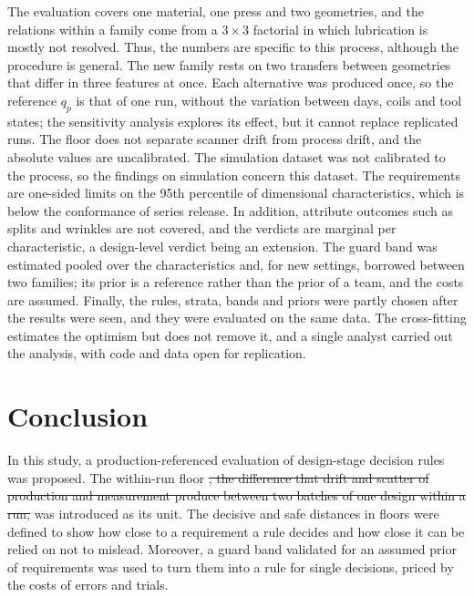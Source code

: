 \documentclass[pdflatex,sn-basic,lineno]{sn-jnl}
\providecommand{\DIFdel}[1]{{\protect\color{red}\sout{#1}}}                      %
\providecommand{\DIFdelbegin}{} %
\providecommand{\DIFdelend}{} %
\newcommand{\DIFscaledelfig}{0.5}
\newlength{\DIFdelgraphicswidth} %
\newlength{\DIFdelgraphicsheight} %
\newcommand{\DIFdelincludegraphics}[2][]{%
\sbox{\DIFdelgraphicsbox}{\DIFOincludegraphics[#1]{#2}}%
\settoboxwidth{\DIFdelgraphicswidth}{\DIFdelgraphicsbox} %
\settoboxtotalheight{\DIFdelgraphicsheight}{\DIFdelgraphicsbox} %
\scalebox{\DIFscaledelfig}{%
\parbox[b]{\DIFdelgraphicswidth}{\usebox{\DIFdelgraphicsbox}\\[-\baselineskip] \rule{\DIFdelgraphicswidth}{0em}}\llap{\resizebox{\DIFdelgraphicswidth}{\DIFdelgraphicsheight}{%
\setlength{\unitlength}{\DIFdelgraphicswidth}%
\begin{picture}(1,1)%
\thicklines\linethickness{2pt} %
{\color[rgb]{1,0,0}\put(0,0){\framebox(1,1){}}}%
{\color[rgb]{1,0,0}\put(0,0){\line( 1,1){1}}}%
{\color[rgb]{1,0,0}\put(0,1){\line(1,-1){1}}}%
\end{picture}%
}\hspace*{3pt}}} %
} %
\DeclareRobustCommand{\DIFdelbegin}{\DIFOdelbegin \let\includegraphics\DIFdelincludegraphics} %
\DeclareRobustCommand{\DIFdelend}{\DIFOaddend \let\includegraphics\DIFOincludegraphics} %
\begin{document}
The evaluation covers one material, one press and two geometries, and the relations within a family come from a $3\times3$ factorial in which lubrication is mostly not resolved. Thus, the numbers are specific to this process, although the procedure is general. The new family rests on two transfers between geometries that differ in three features at once. Each alternative was produced once, so the reference $q_p$ is that of one run, without the variation between days, coils and tool states; the sensitivity analysis explores its effect, but it cannot replace replicated runs. The floor does not separate scanner drift from process drift, and the absolute values are uncalibrated. The simulation dataset was not calibrated to the process, so the findings on simulation concern this dataset. The requirements are one-sided limits on the 95th percentile of dimensional characteristics, which is below the conformance of series release. In addition, attribute outcomes such as splits and wrinkles are not covered, and the verdicts are marginal per characteristic, a design-level verdict being an extension. The guard band was estimated pooled over the characteristics and, for new settings, borrowed between two families; its prior is a reference rather than the prior of a team, and the costs are assumed. Finally, the rules, strata, bands and priors were partly chosen after the results were seen, and they were evaluated on the same data. The cross-fitting estimates the optimism but does not remove it, and a single analyst carried out the analysis, with code and data open for replication.

\section{Conclusion}\label{sec:conclusion}

In this study, a production-referenced evaluation of design-stage decision rules was proposed. The within-run floor \DIFdelbegin \DIFdel{, the difference that drift and scatter of production and measurement produce between two batches of one design within a run, }\DIFdelend was introduced as its unit. The decisive and safe distances in floors were defined to show how close to a requirement a rule decides and how close it can be relied on not to mislead. Moreover, a guard band validated for an assumed prior of requirements was used to turn them into a rule for single decisions, priced by the costs of errors and trials.
\end{document}
